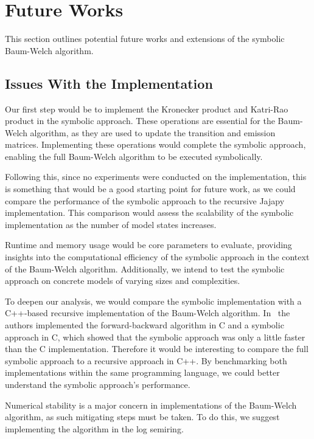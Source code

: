\section{Future Works}\label{sec:future_works}
This section outlines potential future works and extensions of the symbolic Baum-Welch algorithm.

\subsection{Issues With the Implementation}
Our first step would be to implement the Kronecker product and Katri-Rao product in the symbolic approach. 
These operations are essential for the Baum-Welch algorithm, as they are used to update the transition and emission matrices.
Implementing these operations would complete the symbolic approach, enabling the full Baum-Welch algorithm to be executed symbolically.

Following this, since no experiments were conducted on the implementation, this is something that would be a good starting point for future work, as we could compare the performance of the symbolic approach to the recursive Jajapy implementation.
This comparison would assess the scalability of the symbolic implementation as the number of model states increases. 

Runtime and memory usage would be core parameters to evaluate, providing insights into the computational efficiency of the symbolic approach in the context of the Baum-Welch algorithm.
Additionally, we intend to test the symbolic approach on concrete models of varying sizes and complexities. 

To deepen our analysis, we would compare the symbolic implementation with a C++-based recursive implementation of the Baum-Welch algorithm. 
In~\cite{p7} the authors implemented the forward-backward algorithm in C and a symbolic approach in C, which showed that the symbolic approach was only a little faster than the C implementation.
Therefore it would be interesting to compare the full symbolic approach to a recursive approach in C++.
By benchmarking both implementations within the same programming language, we could better understand the symbolic approach's performance.

Numerical stability is a major concern in implementations of the Baum-Welch algorithm, as such mitigating steps must be taken.
To do this, we suggest implementing the algorithm in the log semiring.


